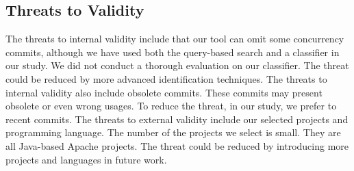 \subsection{Threats to Validity}

The threats to internal validity include that our tool can omit some concurrency commits, although we have used both the query-based search and a classifier in our study. We did not conduct a thorough evaluation on our classifier. The threat could be reduced by more advanced identification techniques. The threats to internal validity also include obsolete commits. These commits may present obsolete or even wrong usages. To reduce the threat, in our study, we prefer to recent commits. The threats to external validity include our selected projects and programming language. The number of the projects we select is small. They are all Java-based Apache projects. The threat could be reduced by introducing more projects and languages in future work.

